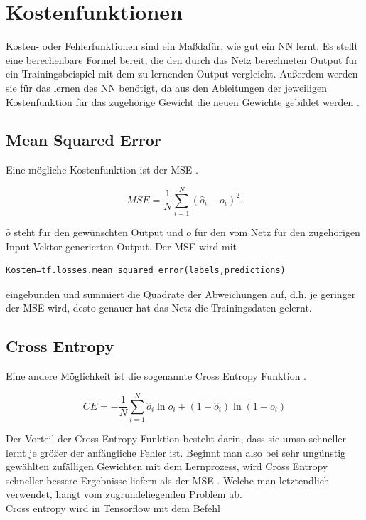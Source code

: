 \section{Kostenfunktionen}
Kosten- oder Fehlerfunktionen sind ein Ma\ss daf\"ur, wie gut ein \gls{NN} lernt. Es stellt eine berechenbare Formel bereit, die den durch das Netz berechneten Output f\"ur ein Trainingsbeispiel mit dem zu lernenden Output vergleicht. Au\ss erdem werden sie f\"ur das lernen des \gls{NN} ben\"otigt, da aus den Ableitungen der jeweiligen Kostenfunktion f\"ur das zugeh\"orige Gewicht die neuen Gewichte gebildet werden \cite{Goodfellow}.


\subsection{Mean Squared Error}
Eine m\"ogliche Kostenfunktion ist der \gls{MSE} \cite{Rojas1996}.

\begin{equation}
MSE=\frac{1}{N}\sum_{i=1}^{N} (\hat{o}_i-o_i)^2.
\end{equation}

$\hat{o}$ steht f\"ur den gew\"unschten Output und $o$ f\"ur den vom Netz f\"ur den zugeh\"origen Input-Vektor generierten Output.
Der \gls{MSE} wird mit \cite{cookbook}

\vspace{0.3cm}
\begin{lstlisting}
Kosten=tf.losses.mean_squared_error(labels,predictions)
\end{lstlisting}

eingebunden und summiert die Quadrate der Abweichungen auf, d.h. je geringer der \gls{MSE} wird, desto genauer hat das Netz die Trainingsdaten gelernt.


\subsection{Cross Entropy}
Eine andere M\"oglichkeit ist die sogenannte Cross Entropy Funktion \cite{Nielsen}.

\begin{equation}
CE= - \frac{1}{N} \sum_{i=1}^{N}\hat{o}_i \ln o_i + (1- \hat{o}_i) \ln (1-o_i)
\end{equation}

Der Vorteil der Cross Entropy Funktion besteht darin, dass sie umso schneller lernt je gr\"o\ss er der anf\"angliche Fehler ist. Beginnt man also bei sehr ung\"unstig gew\"ahlten zuf\"alligen Gewichten mit dem Lernprozess, wird Cross Entropy schneller bessere Ergebnisse liefern als der MSE \cite{Nielsen}. Welche man letztendlich verwendet, h\"angt vom zugrundeliegenden Problem ab.\\
Cross entropy wird in Tensorflow mit dem Befehl

